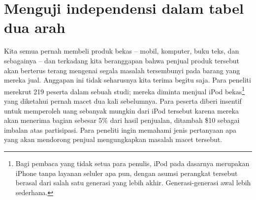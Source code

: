 \section{Menguji independensi dalam tabel dua arah}
\label{twoWayTablesAndChiSquare}


\newcommand{\iPodAA}{2}
\newcommand{\iPodAB}{23}
\newcommand{\iPodAC}{36}
\newcommand{\iPodAD}{61}
\newcommand{\iPodAFraction}{0.2785}
\newcommand{\iPodAExpected}{20.33}
\newcommand{\iPodBA}{71}
\newcommand{\iPodBB}{50}
\newcommand{\iPodBC}{37}
\newcommand{\iPodBD}{158}
\newcommand{\iPodBFraction}{0.7215}
\newcommand{\iPodBExpected}{52.67}
\newcommand{\iPodDA}{73}
\newcommand{\iPodDB}{73}
\newcommand{\iPodDC}{73}
\newcommand{\iPodDD}{219}
\newcommand{\iPodN}{\iPodDD}

Kita semua pernah membeli produk bekas --
mobil, komputer, buku teks, dan sebagainya --
dan terkadang kita beranggapan bahwa penjual produk tersebut
akan berterus terang mengenai segala masalah tersembunyi pada
barang yang mereka jual.
Anggapan ini tidak seharusnya kita terima begitu saja.
Para peneliti merekrut \iPodN{} peserta dalam sebuah studi; mereka
diminta menjual iPod bekas\footnote{Bagi pembaca yang tidak setua
  para penulis, iPod pada dasarnya merupakan iPhone tanpa
  layanan seluler apa pun, dengan asumsi perangkat tersebut berasal dari salah satu
  generasi yang lebih akhir. Generasi-generasi awal lebih sederhana.}
yang diketahui pernah macet dua kali sebelumnya.
Para peserta diberi insentif untuk memperoleh uang sebanyak mungkin
dari iPod tersebut karena mereka akan menerima bagian sebesar 5\%
dari hasil penjualan, ditambah \$10 sebagai imbalan atas partisipasi.
Para peneliti ingin memahami jenis pertanyaan apa
yang akan mendorong penjual mengungkapkan masalah macet tersebut.

